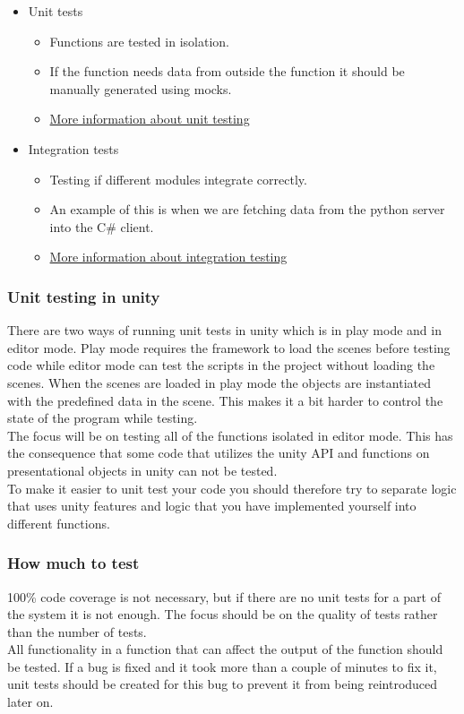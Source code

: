 \begin{itemize}
    \item Unit tests
        \begin{itemize}
            \item Functions are tested in isolation.
            \item If the function needs data from outside the function it should be manually generated using mocks.
            \item \href{http://softwaretestingfundamentals.com/unit-testing/}{More information about unit testing}
        \end{itemize}
    \item Integration tests
        \begin{itemize}
            \item Testing if different modules integrate correctly.
            \item An example of this is when we are fetching data from the python server into the C\# client.
            \item \href{http://softwaretestingfundamentals.com/integration-testing/}{More information about integration testing}
        \end{itemize}
\end{itemize}

\subsubsection{Unit testing in unity}
There are two ways of running unit tests in unity which is in play mode and in editor mode. 
Play mode requires the framework to load the scenes before testing code while editor mode can test the scripts in the project without loading the scenes. 
When the scenes are loaded in play mode the objects are instantiated with the predefined data in the scene. 
This makes it a bit harder to control the state of the program while testing.
\\ 
The focus will be on testing all of the functions isolated in editor mode. 
This has the consequence that some code that utilizes the unity API and functions on presentational objects in unity can not be tested.
\\
To make it easier to unit test your code you should therefore try to separate logic that uses unity features and logic that you have implemented yourself into different functions.


\subsubsection{How much to test}
100\% code coverage is not necessary, but if there are no unit tests for a part of the system it is not enough. 
The focus should be on the quality of tests rather than the number of tests.
\\
All functionality in a function that can affect the output of the function should be tested.
If a bug is fixed and it took more than a couple of minutes to fix it, unit tests should be created for this bug to prevent it from being reintroduced later on.
